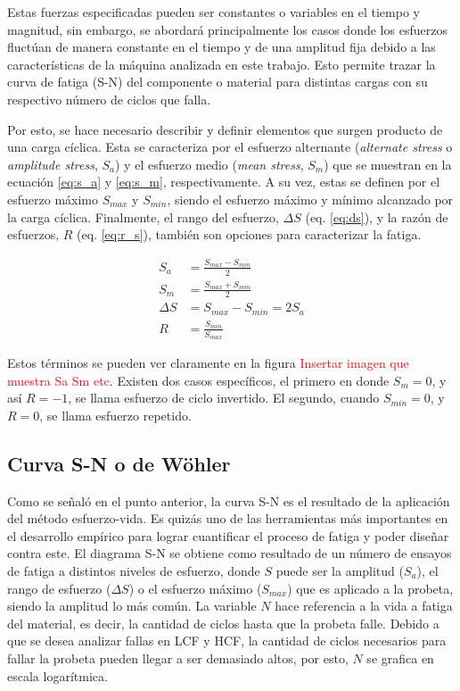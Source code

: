 Estas fuerzas especificadas pueden ser constantes o variables en el tiempo y magnitud, sin embargo, se abordará principalmente los casos donde los esfuerzos fluctúan de manera constante en el tiempo y de una amplitud fija debido a las características de la máquina analizada en este trabajo. Esto permite trazar la curva de fatiga (S-N) del componente o material para distintas cargas con su respectivo número de ciclos que falla.

Por esto, se hace necesario describir y definir elementos que surgen producto de una carga cíclica. Esta se caracteriza por el esfuerzo alternante (\textit{alternate stress} o \textit{amplitude stress}, $S_a$) y el esfuerzo medio (\textit{mean stress}, $S_m$) que se muestran en la ecuación \ref{eq:s_a} y \ref{eq:s_m}, respectivamente. A su vez, estas se definen por el esfuerzo máximo $S_{max}$ y $S_{min}$, siendo el esfuerzo máximo y mínimo alcanzado por la carga cíclica. Finalmente, el rango del esfuerzo, $\Delta S$ (eq. \ref{eq:ds}), y la razón de esfuerzos, $R$ (eq. \ref{eq:r_s}), también son opciones  para caracterizar la fatiga.

\begin{align}
	S_a &= \frac{S_{max} - S_{min}}{2} \label{eq:s_a} \\
	S_m &= \frac{S_{max} + S_{min}}{2} \label{eq:s_m} \\
	\Delta S &= S_{max} - S_{min} = 2S_a  \label{eq:ds} \\
	R &= \frac{S_{min}}{S_{max}} \label{eq:r_s} 
\end{align}

Estos términos se pueden ver claramente en la figura \textcolor{red}{Insertar imagen que muestra Sa Sm etc}. Existen dos casos específicos, el primero en donde $S_m = 0$, y así $R=-1$, se llama esfuerzo de ciclo invertido. El segundo, cuando $S_{min}=0$, y $R=0$, se llama esfuerzo repetido.

\subsection{Curva S-N o de Wöhler}
Como se señaló en el punto anterior, la curva S-N es el resultado de la aplicación del método esfuerzo-vida. Es quizás uno de las herramientas más importantes en el desarrollo empírico para lograr cuantificar el proceso de fatiga y poder diseñar contra este. El diagrama S-N se obtiene como resultado de un número de ensayos de fatiga a distintos niveles de esfuerzo, donde $S$ puede ser la amplitud ($S_a$), el rango de esfuerzo ($\Delta S$) o el esfuerzo máximo ($S_{max}$) que es aplicado a la probeta, siendo la amplitud lo más común. La variable $N$ hace referencia a la vida a fatiga del material, es decir, la cantidad de ciclos hasta que la probeta falle. Debido a que se desea analizar fallas en LCF y HCF, la cantidad de ciclos necesarios para fallar la probeta pueden llegar a ser demasiado altos, por esto, $N$ se grafica en escala logarítmica.

